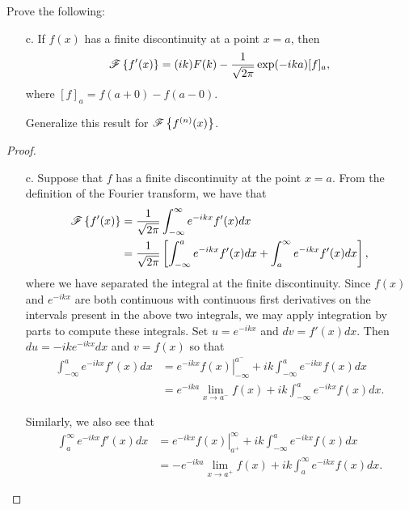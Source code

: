 \begin{problem}{2.5}
  Prove the following:
  \begin{enumerate}
    \item [c.] If $f(x)$ has a finite discontinuity at a point $x = a$, then
      \begin{align*}
        \mathscr{F}\left\{ {f'(x)} \right\} = (ik) F(k) - \frac{1}{\sqrt{2\pi}}\exp(-ika)[f]_a,
      \end{align*}
      where $[f]_a = f(a + 0) - f (a - 0).$

      Generalize this result for $\mathscr{F}\left\{ {f^{(n)}(x)} \right\}$.
  \end{enumerate}
\end{problem}

\begin{proof}
  \begin{enumerate}
    \item [c.] Suppose that $f$ has a finite discontinuity at the point $x=a$. From
      the definition of the Fourier transform, we have that
      \begin{align}\label{5_int}
        \mathscr{F}\left\{ {f'(x)} \right\} &= \frac{1}{\sqrt{2\pi}} \int_{-\infty}^{\infty} e^{-ikx} f'(x) dx \notag \\
        &= \frac{1}{\sqrt{2\pi}} \left[\int_{-\infty}^{a} e^{-ikx} f'(x) dx + \int_{a}^{\infty} e^{-ikx} f'(x) dx \right],
      \end{align}
      where we have separated the integral at the finite discontinuity. Since $f(x)$ and $e^{-ikx}$ are both
      continuous with continuous first derivatives on the intervals present in the above two integrals,
      we may apply integration by parts to compute these integrals. Set $u=e^{-ikx}$ and $dv=f'(x)dx$. Then
      $du = -ik e^{-ikx}dx$ and $v = f(x)$ so that
      \begin{align*}
        \int_{-\infty}^{a} e^{-ikx} f'(x) dx &= \left. e^{-ikx}f(x) \right\rvert_{-\infty}^{a^-} + ik \int_{-\infty}^a e^{-ikx}f(x) dx \\
        &= e^{-ika} \lim_{x\to a^{-}}f(x)  + ik \int_{-\infty}^a e^{-ikx}f(x) dx.
      \end{align*}

      Similarly, we also see that
      \begin{align*}
        \int_{a}^{\infty} e^{-ikx} f'(x) dx
        &= \left. e^{-ikx}f(x) \right\rvert_{a^+}^{\infty} + ik \int_{-\infty}^a e^{-ikx}f(x) dx \\
        &= -e^{-ika} \lim_{x\to a^{+}}f(x)  + ik \int_{a}^\infty e^{-ikx}f(x) dx.
      \end{align*}


\end{enumerate}
\end{proof}
